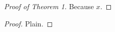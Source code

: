 \documentclass{article}
\begin{document}
\begin{proof}[Proof of Theorem 1]
Because $x$.
\end{proof}

\begin{proof}
Plain.
\end{proof}
\end{document}
